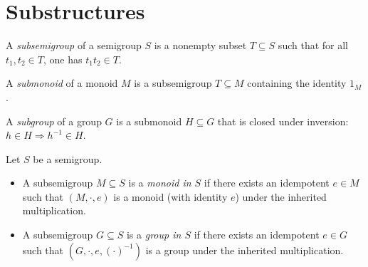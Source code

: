 

\section{Substructures}

\begin{definition}[Subsemigroup]
\label{def:subsemigroup}
A \emph{subsemigroup} of a semigroup \(S\) is a nonempty subset \(T\subseteq S\) such that for all \(t_1,t_2\in T\), one has \(t_1t_2\in T\).
\end{definition}

\begin{definition}
\label{def:submonoid}
A \emph{submonoid} of a monoid \(M\) is a subsemigroup \(T\subseteq M\) containing the identity \(1_M\).
\end{definition}

\begin{definition}
\label{def:subgroup}
A \emph{subgroup} of a group \(G\) is a submonoid \(H\subseteq G\) that is closed under inversion: \(h\in H\Rightarrow h^{-1}\in H\).
\end{definition}

\begin{definition}
\label{def:internal-monoid-group}
Let \(S\) be a semigroup.
\begin{itemize}
  \item A subsemigroup \(M\subseteq S\) is a \emph{monoid in \(S\)} if there exists an idempotent \(e\in M\) such that \((M,\cdot,e)\) is a monoid (with identity \(e\)) under the inherited multiplication.
  \item A subsemigroup \(G\subseteq S\) is a \emph{group in \(S\)} if there exists an idempotent \(e\in G\) such that \((G,\cdot,e,(\cdot)^{-1})\) is a group under the inherited multiplication.
\end{itemize}
\end{definition}

